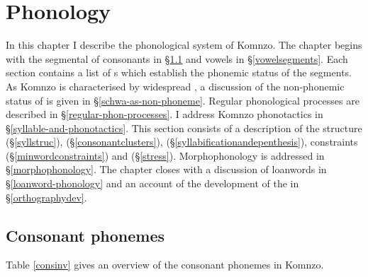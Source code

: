 
\chapter{Phonology} \label{cha:Phonology}
\vspace{-0,2cm}
In this chapter I describe the phonological system of Komnzo. The chapter begins with the segmental  of consonants in \S{}\ref{consonant-segments} and vowels in \S{}\ref{vowelsegments}. Each section contains a list of s which establish the phonemic status of the segments. As Komnzo  is characterised by widespread , a discussion of the non-phonemic status of  is given in \S{}\ref{schwa-as-non-phoneme}. Regular phonological processes are described in \S{}\ref{regular-phon-processes}. I address Komnzo phonotactics in \S{}\ref{syllable-and-phonotactics}. This section consists of a description of the  structure (\S{}\ref{syllstruc}),  (\S{}\ref{consonantclusters}),  (\S{}\ref{syllabificationandepenthesis}),  constraints (\S{}\ref{minwordconstraints}) and  (\S{}\ref{stress}). Morphophonology is addressed in \S{}\ref{morphophonology}. The chapter closes with a discussion of loanwords in \S{}\ref{loanword-phonology} and an account of the development of the  in \S{}\ref{orthographydev}.
\vspace{-0,3cm}

\section{Consonant phonemes} \label{consonant-segments}

Table \ref{consinv} gives an overview of the consonant phonemes in Komnzo. %

